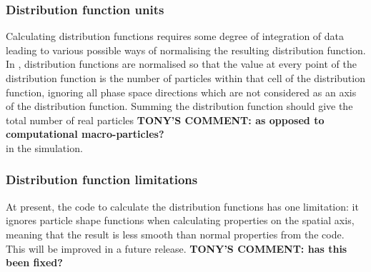 \documentclass[12pt,a4paper]{article}
\newcommand{\EPOCH}{{\color{warwickdark}\fontfamily{phv}\selectfont{EPOCH}}}
\newcommand{\tony}[1]{{\color{warwickred} \bf{TONY'S COMMENT:} \bf{#1}}\\}
\begin{document}
\subsubsection{Distribution function units}
Calculating distribution functions requires some degree of integration of data
leading to various possible ways of normalising the resulting distribution
function. In {\EPOCH}, distribution functions are normalised so that the value
at every point of the distribution function is the number of particles within
that cell of the distribution function, ignoring all phase space directions
which are not considered as an axis of the distribution function. Summing the
distribution function should give the total number of real particles
\tony{as opposed to computational macro-particles?} in the
simulation.

\subsubsection{Distribution function limitations}
At present, the code to calculate the distribution functions has one
limitation: it ignores particle shape functions when calculating properties
on the spatial axis, meaning that the result is less smooth than normal
properties from the code. This will be improved in a future release.
\tony{has this been fixed?}
\end{document}

